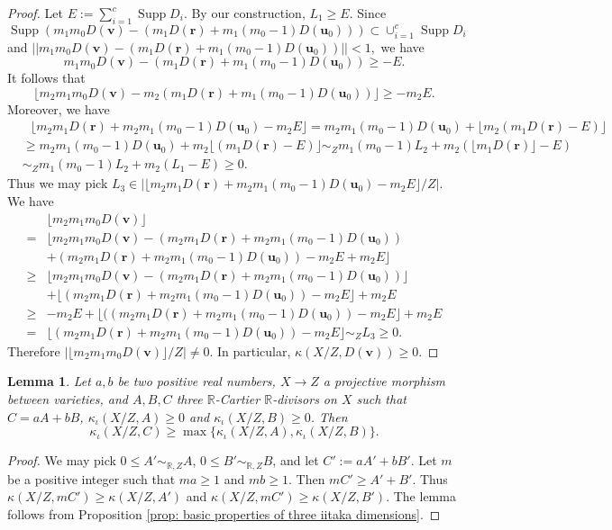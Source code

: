 \documentclass[11pt]{amsart}
\numberwithin{equation}{section}
\newcommand{\Rr}{\mathbb{R}}
\newcommand{\Supp}{\operatorname{Supp}}
\newtheorem{lem}[thm]{Lemma}
\theoremstyle{definition}
\theoremstyle{definition}
\begin{document}
\begin{proof}
Let $E:=\sum_{i=1}^c\Supp D_i$. By our construction, $L_1\geq E$. Since
$$\Supp\left(m_1m_0D(\bm{v})-(m_1D(\bm{r})+m_1(m_0-1)D(\bm{u}_0))\right)\subset\cup_{i=1}^c\Supp D_i$$
and
$||m_1m_0D(\bm{v})-(m_1D(\bm{r})+m_1(m_0-1)D(\bm{u}_0))||<1,$
we have
$$m_1m_0D(\bm{v})-(m_1D(\bm{r})+m_1(m_0-1)D(\bm{u}_0))\geq -E.$$
It follows that
$$\lfloor m_2m_1m_0D(\bm{v})-m_2(m_1D(\bm{r})+m_1(m_0-1)D(\bm{u}_0))\rfloor \geq -m_2E.$$
Moreover, we have
\begin{align*}
    &\ \ \ \lfloor m_2m_1D(\bm{r})+m_2m_1(m_0-1)D(\bm{u}_0)-m_2E\rfloor=m_2m_1(m_0-1)D(\bm{u}_0)+\lfloor m_2(m_1D(\bm{r})-E)\rfloor\\&
    \geq m_2m_1(m_0-1)D(\bm{u}_0)+m_2\lfloor(m_1D(\bm{r})-E)\rfloor\sim_Z m_1(m_0-1)L_2+m_2(\lfloor m_1D(\bm{r})\rfloor-E)\\&
    \sim_Z m_1(m_0-1)L_2+m_2(L_1-E)\geq 0.
\end{align*}
Thus we may pick $L_3\in |\lfloor m_2m_1D(\bm{r})+m_2m_1(m_0-1)D(\bm{u}_0)-m_2E\rfloor/Z|.$
We have
\begin{align*}
    &\lfloor m_2m_1m_0D(\bm{v})\rfloor\\
    =&\lfloor m_2m_1m_0D(\bm{v})-(m_2m_1D(\bm{r})+m_2m_1(m_0-1)D(\bm{u}_0))\\
    &+(m_2m_1D(\bm{r})+m_2m_1(m_0-1)D(\bm{u}_0))-m_2E+m_2E\rfloor\\
    \geq& \lfloor m_2m_1m_0D(\bm{v})-(m_2m_1D(\bm{r})+m_2m_1(m_0-1)D(\bm{u}_0))\rfloor\\
    &+\lfloor (m_2m_1D(\bm{r})+m_2m_1(m_0-1)D(\bm{u}_0))-m_2E\rfloor+m_2E\\
    \geq &-m_2E+\lfloor ((m_2m_1D(\bm{r})+m_2m_1(m_0-1)D(\bm{u}_0))-m_2E\rfloor+m_2E\\
    =&\lfloor (m_2m_1D(\bm{r})+m_2m_1(m_0-1)D(\bm{u}_0))-m_2E\rfloor\sim_Z L_3\geq 0.
\end{align*}
Therefore $|\lfloor m_2m_1m_0D(\bm{v})\rfloor/Z|\neq0$. In particular, $\kappa(X/Z,D(\bm{v}))\geq 0$.
\end{proof}


\begin{lem}\label{lem: inv kod linear geq maximum}
Let $a,b$ be two positive real numbers, $X\rightarrow Z$ a projective morphism between varieties, and $A,B,C$ three $\Rr$-Cartier $\Rr$-divisors on $X$ such that $C=aA+bB$, $\kappa_{\iota}(X/Z,A)\ge0$ and $\kappa_{\iota}(X/Z,B)\geq 0$. Then $$\kappa_{\iota}(X/Z,C)\geq\max\{\kappa_{\iota}(X/Z,A),\kappa_{\iota}(X/Z,B)\}.$$
\end{lem}
\begin{proof}
We may pick $0\leq A'\sim_{\Rr,Z}A$, $0\leq B'\sim_{\Rr,Z}B$, and let $C':=aA'+bB'$. Let $m$ be a positive integer such that $ma\geq 1$ and $mb\geq 1$. Then $mC'\geq A'+B'$. Thus $\kappa(X/Z,mC')\geq\kappa(X/Z,A')$ and  $\kappa(X/Z,mC')\geq\kappa(X/Z,B')$. The lemma follows from Proposition \ref{prop: basic properties of three iitaka dimensions}.
\end{proof}
\end{document}
